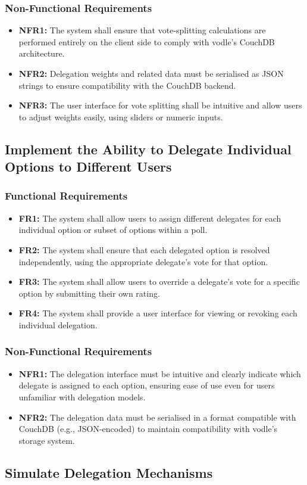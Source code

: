\subsubsection{Non-Functional Requirements}
\begin{itemize}
    \item \textbf{NFR1:} The system shall ensure that vote-splitting calculations are performed entirely on the client side to comply with vodle's CouchDB architecture.

    \item \textbf{NFR2:} Delegation weights and related data must be serialised as JSON strings to ensure compatibility with the CouchDB backend.

    \item \textbf{NFR3:} The user interface for vote splitting shall be intuitive and allow users to adjust weights easily, using sliders or numeric inputs.
\end{itemize}
\subsection{Implement the Ability to Delegate Individual Options to Different Users}
\subsubsection{Functional Requirements}
\begin{itemize}
    \item \textbf{FR1:} The system shall allow users to assign different delegates for each individual option or subset of options within a poll.

    \item \textbf{FR2:} The system shall ensure that each delegated option is resolved independently, using the appropriate delegate's vote for that option.

    \item \textbf{FR3:} The system shall allow users to override a delegate's vote for a specific option by submitting their own rating.

    \item \textbf{FR4:} The system shall provide a user interface for viewing or revoking each individual delegation.
\end{itemize}

\subsubsection{Non-Functional Requirements}
\begin{itemize}
    \item \textbf{NFR1:} The delegation interface must be intuitive and clearly indicate which delegate is assigned to each option, ensuring ease of use even for users unfamiliar with delegation models.

    \item \textbf{NFR2:} The delegation data must be serialised in a format compatible with CouchDB (e.g., JSON-encoded) to maintain compatibility with vodle's storage system.
\end{itemize}
\subsection{Simulate Delegation Mechanisms}